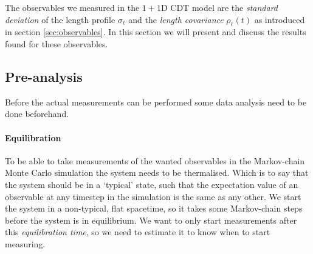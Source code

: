 The observables we measured in the $1 + 1$D CDT model are the \emph{standard deviation} of the length profile $\sigma_\ell$ and the \emph{length covariance} $\rho_\ell(t)$ as introduced in section \ref{sec:observables}.
In this section we will present and discuss the results found for these observables.

\subsection{Pre-analysis}
Before the actual measurements can be performed some data analysis need to be done beforehand.

\paragraph{Equilibration}
To be able to take measurements of the wanted observables in the Markov-chain Monte Carlo simulation the system needs to be thermalised. Which is to say that the system should be in a `typical' state, such that the expectation value of an observable at any timestep in the simulation is the same as any other.
We start the system in a non-typical, flat spacetime, so it takes some Markov-chain steps before the system is in equilibrium.
We want to only start measurements after this \emph{equilibration time}, so we need to estimate it to know when to start measuring.


